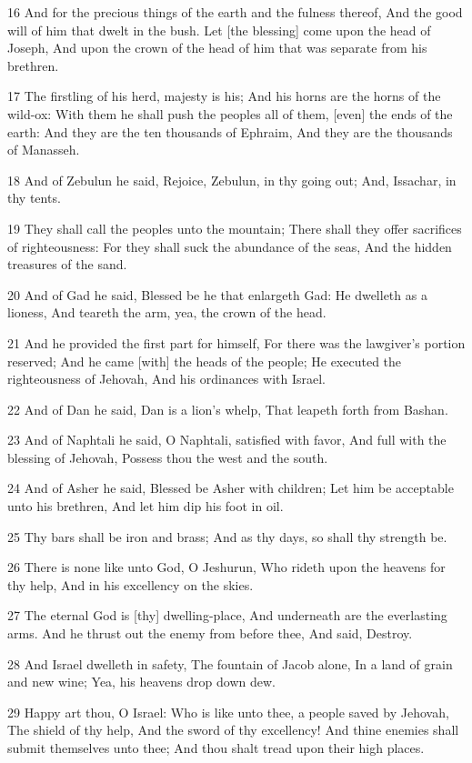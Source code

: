 \par 16 And for the precious things of the earth and the fulness thereof, And the good will of him that dwelt in the bush. Let [the blessing] come upon the head of Joseph, And upon the crown of the head of him that was separate from his brethren.
\par 17 The firstling of his herd, majesty is his; And his horns are the horns of the wild-ox: With them he shall push the peoples all of them, [even] the ends of the earth: And they are the ten thousands of Ephraim, And they are the thousands of Manasseh.
\par 18 And of Zebulun he said, Rejoice, Zebulun, in thy going out; And, Issachar, in thy tents.
\par 19 They shall call the peoples unto the mountain; There shall they offer sacrifices of righteousness: For they shall suck the abundance of the seas, And the hidden treasures of the sand.
\par 20 And of Gad he said, Blessed be he that enlargeth Gad: He dwelleth as a lioness, And teareth the arm, yea, the crown of the head.
\par 21 And he provided the first part for himself, For there was the lawgiver's portion reserved; And he came [with] the heads of the people; He executed the righteousness of Jehovah, And his ordinances with Israel.
\par 22 And of Dan he said, Dan is a lion's whelp, That leapeth forth from Bashan.
\par 23 And of Naphtali he said, O Naphtali, satisfied with favor, And full with the blessing of Jehovah, Possess thou the west and the south.
\par 24 And of Asher he said, Blessed be Asher with children; Let him be acceptable unto his brethren, And let him dip his foot in oil.
\par 25 Thy bars shall be iron and brass; And as thy days, so shall thy strength be.
\par 26 There is none like unto God, O Jeshurun, Who rideth upon the heavens for thy help, And in his excellency on the skies.
\par 27 The eternal God is [thy] dwelling-place, And underneath are the everlasting arms. And he thrust out the enemy from before thee, And said, Destroy.
\par 28 And Israel dwelleth in safety, The fountain of Jacob alone, In a land of grain and new wine; Yea, his heavens drop down dew.
\par 29 Happy art thou, O Israel: Who is like unto thee, a people saved by Jehovah, The shield of thy help, And the sword of thy excellency! And thine enemies shall submit themselves unto thee; And thou shalt tread upon their high places.

